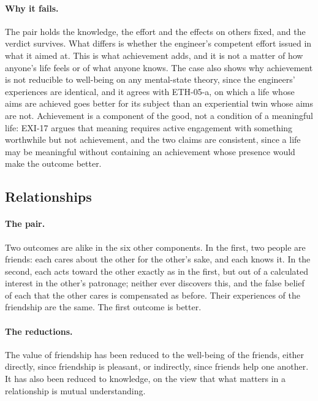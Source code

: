 \documentclass{situationist-preprint}
\begin{document}
\paragraph{Why it fails.} The pair holds the knowledge, the effort and the effects on others fixed, and the verdict survives. What differs is whether the engineer's competent effort issued in what it aimed at. This is what achievement adds, and it is not a matter of how anyone's life feels or of what anyone knows. The case also shows why achievement is not reducible to well-being on any mental-state theory, since the engineers' experiences are identical, and it agrees with ETH-05-a, on which a life whose aims are achieved goes better for its subject than an experiential twin whose aims are not. Achievement is a component of the good, not a condition of a meaningful life: EXI-17 argues that meaning requires active engagement with something worthwhile but not achievement, and the two claims are consistent, since a life may be meaningful without containing an achievement whose presence would make the outcome better.

\subsection{Relationships}

\paragraph{The pair.} Two outcomes are alike in the six other components. In the first, two people are friends: each cares about the other for the other's sake, and each knows it. In the second, each acts toward the other exactly as in the first, but out of a calculated interest in the other's patronage; neither ever discovers this, and the false belief of each that the other cares is compensated as before. Their experiences of the friendship are the same. The first outcome is better.

\paragraph{The reductions.} The value of friendship has been reduced to the well-being of the friends, either directly, since friendship is pleasant, or indirectly, since friends help one another. It has also been reduced to knowledge, on the view that what matters in a relationship is mutual understanding.
\end{document}
